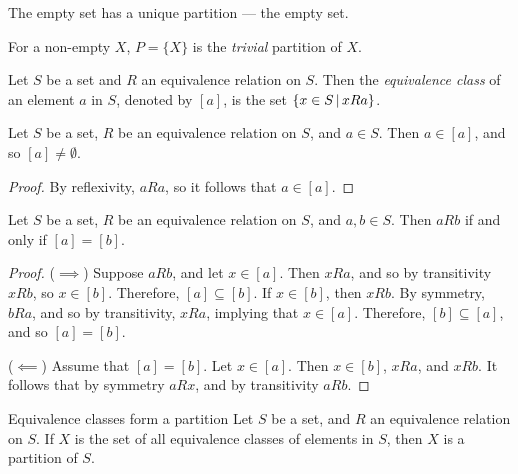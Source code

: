 \begin{exmp}
    The empty set has a unique partition --- the empty set.
\end{exmp}

\begin{defn}
    For a non-empty $X$, $P = \{X\}$ is the \emph{trivial} partition of $X$.
\end{defn}

\begin{defn}\label{equivalence-class}
    Let $S$ be a set and $R$ an equivalence relation on $S$. Then the \emph{equivalence class} of an element $a$ in $S$, denoted by $\left[a\right]$, is the set $\left\{x \in S \,\middle|\, x R a\right\}$.
\end{defn}

\begin{lemma}\label{equiv-class-non-empty}
    Let $S$ be a set, $R$ be an equivalence relation on $S$, and $a \in S$. Then $a \in [a]$, and so $[a] \neq \emptyset$.
\end{lemma}

\begin{proof}
    By reflexivity, $a R a$, so it follows that $a \in [a]$.
\end{proof}

\begin{lemma}\label{equiv-class-equal}
    Let $S$ be a set, $R$ be an equivalence relation on $S$, and $a, b \in S$. Then $a R b$ if and only if $[a] = [b]$.
\end{lemma}

\begin{proof}\proofbreak
    ($\implies$) Suppose $a R b$, and let $x \in [a]$. Then $x R a$, and so by transitivity $x R b$, so $x \in [b]$. Therefore, $[a] \subseteq [b]$. If $x \in [b]$, then $x R b$. By symmetry, $b R a$, and so by transitivity, $x R a$, implying that $x \in [a]$. Therefore, $[b] \subseteq [a]$, and so $[a] = [b]$.

    ($\impliedby$) Assume that $[a] = [b]$. Let $x \in [a]$. Then $x \in [b]$, $x R a$, and $x R b$. It follows that by symmetry $a R x$, and by transitivity $a R b$.
\end{proof}

\begin{thm}{Equivalence classes form a partition}\proofbreak
    Let $S$ be a set, and $R$ an equivalence relation on $S$. If $X$ is the set of all equivalence classes of elements in $S$, then $X$ is a partition of $S$.
\end{thm}

